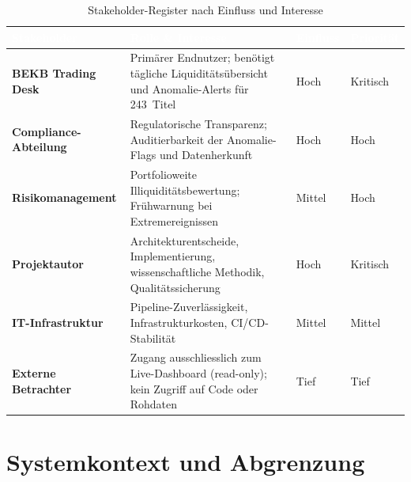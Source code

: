 \documentclass[11pt, a4paper, oneside, openany]{report}
\begin{document}
\begin{table}[H]
\centering
\caption{Stakeholder-Register nach Einfluss und Interesse}
\label{tab:stakeholders}
\sffamily\small
\begin{tabularx}{\textwidth}{>{\bfseries}l X l l}
  \toprule
  \rowcolor{DeepNavy} \textcolor{white}{\textbf{Stakeholder}} & \textcolor{white}{\textbf{Rolle \& Interesse}} & \textcolor{white}{\textbf{Einfluss}} & \textcolor{white}{\textbf{Priorität}} \\
  \midrule
  BEKB Trading Desk     & Primärer Endnutzer; benötigt tägliche Liquiditätsübersicht und Anomalie-Alerts für 243~Titel                       & Hoch   & Kritisch \\
  Compliance-Abteilung  & Regulatorische Transparenz; Auditierbarkeit der Anomalie-Flags und Datenherkunft                                   & Hoch   & Hoch \\
  Risikomanagement      & Portfolioweite Illiquiditätsbewertung; Frühwarnung bei Extremereignissen                                            & Mittel & Hoch \\
  Projektautor          & Architekturentscheide, Implementierung, wissenschaftliche Methodik, Qualitätssicherung                              & Hoch   & Kritisch \\
  IT-Infrastruktur      & Pipeline-Zuverlässigkeit, Infrastrukturkosten, CI/CD-Stabilität                                                     & Mittel & Mittel \\
  Externe Betrachter    & Zugang ausschliesslich zum Live-Dashboard (read-only); kein Zugriff auf Code oder Rohdaten                          & Tief   & Tief \\
  \bottomrule
\end{tabularx}
\end{table}

\section{Systemkontext und Abgrenzung}
\label{sec:kontext}
\end{document}
